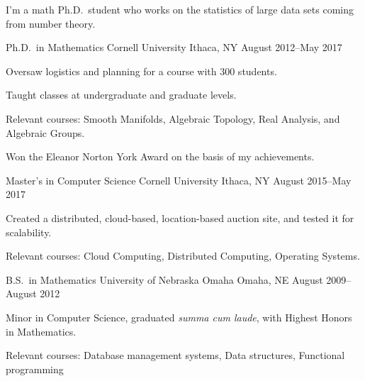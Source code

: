 \documentclass[11pt, letterpaper]{awesome-cv}
\begin{document}
\makecvheader





\begin{cvparagraph}

I'm a math Ph.D.~student who works on the statistics of large data sets coming from number theory. 
\end{cvparagraph}






\begin{cventries}

\cventry
	{Ph.D.~in Mathematics}
	{Cornell University}
	{Ithaca, NY}
	{August 2012--May 2017}
	{
		\begin{cvitems}
			\item{Oversaw logistics and planning for a course with 300 students.}
			\item{Taught classes at undergraduate and graduate levels.}
			\item{Relevant courses: Smooth Manifolds, Algebraic Topology, Real Analysis, and Algebraic Groups.}
			\item{Won the Eleanor Norton York Award on the basis of my achievements.}
		\end{cvitems}
	}
	
\cventry
	{Master's in Computer Science}
	{Cornell University}
	{Ithaca, NY}
	{August 2015--May 2017}
	{
		\begin{cvitems}
			\item{Created a distributed, cloud-based, location-based auction site, and tested it for scalability.}
			\item{Relevant courses: Cloud Computing, Distributed Computing, Operating Systems.}
		\end{cvitems}
	}
	
\cventry
	{B.S.~in Mathematics}
	{University of Nebraska Omaha}
	{Omaha, NE}
	{August 2009--August 2012}
	{
		\begin{cvitems}
			\item{Minor in Computer Science, graduated \emph{summa cum laude}, with Highest Honors in Mathematics.}
			\item{Relevant courses: Database management systems, Data structures, Functional programming}
		\end{cvitems}
	}
	
\end{cventries}
\end{document}
